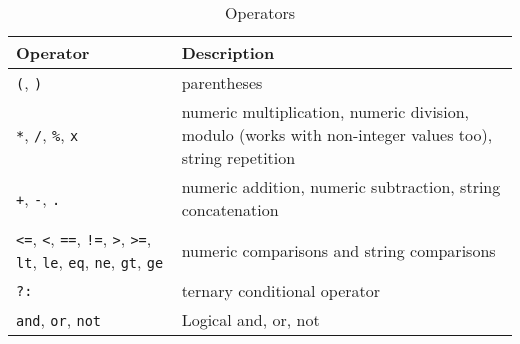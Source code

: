 \begin{table}[htb]
\begin{tabular}{|l|p{7cm}|}
\hline
Operator & Description \\
\hline
\hline

\texttt{(}, \texttt{)} & parentheses \\

\hline

\texttt{*}, \texttt{/}, \texttt{\%}, \texttt{x} &
numeric multiplication, numeric division, modulo (works
with non-integer values too), string repetition \\

\hline

\texttt{+}, \texttt{-}, \texttt{.} & numeric addition,
numeric subtraction, string concatenation \\

\hline

\texttt{<=}, \texttt{<}, \texttt{==},
\texttt{!=}, \texttt{>}, \texttt{>=},
\texttt{lt}, \texttt{le}, \texttt{eq},
\texttt{ne}, \texttt{gt}, \texttt{ge} &
numeric comparisons and string comparisons \\

\hline

\texttt{?:} & ternary conditional operator \\

\hline

\texttt{and},
\texttt{or},
\texttt{not} &
Logical and, or, not \\

\hline

\end{tabular}
\caption{Operators}
\label{operators}
\end{table}


